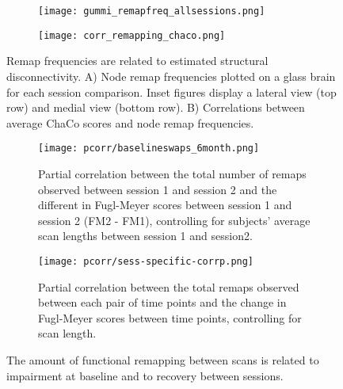 \documentclass[10pt]{article}
\begin{document}
\begin{figure}[ht] %
		\begin{subfigure}{.5\textwidth}
			\centering
			\texttt{[image: gummi\_remapfreq\_allsessions.png]}  
			\caption{ }
			\label{gummi_remaps}
		\end{subfigure}
		\begin{subfigure}{.5\textwidth}
			\centering
			\texttt{[image: corr\_remapping\_chaco.png]}  
			\caption{ }
			\label{corr_remapping_chaco}
		\end{subfigure}
	\caption{Remap frequencies are related to estimated structural disconnectivity.  A) Node remap frequencies plotted on a glass brain for each session comparison.  Inset figures display a lateral view (top row) and medial view (bottom row).  B) Correlations between average ChaCo scores and node remap frequencies.}
\end{figure}

\begin{figure} %
		\begin{subfigure}{.5\textwidth}
			\centering
			\texttt{[image: pcorr/baselineswaps\_6month.png]}  
			\caption{Partial correlation between the total number of remaps observed between session 1 and session 2 and the different in Fugl-Meyer scores between session 1 and session 2 (FM2 - FM1), controlling for subjects' average scan lengths  between session 1 and session2.}
			\label{remaps_6monthrecovery}
		\end{subfigure}
		\begin{subfigure}{.5\textwidth}
			\centering
			\texttt{[image: pcorr/sess-specific-corrp.png]}  
			\caption{Partial correlation between the total remaps observed between each pair of time points and the change in Fugl-Meyer scores between time points, controlling for scan length.  }
			\label{remaps_recovery_allsessions}
		\end{subfigure}
	\caption{The amount of functional remapping between scans is related to impairment at baseline and to recovery between sessions.}
\end{figure}

\end{document}
